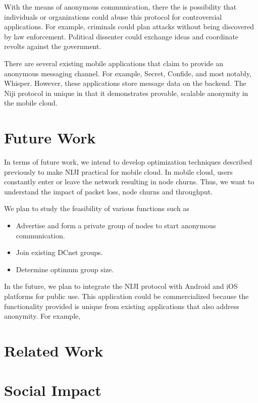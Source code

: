\documentclass{acm_proc_article-sp}
\begin{document}
With the means of anonymous communication, there the is possibility that individuals or organizations could abuse this protocol for controversial applications. For example, criminals could plan attacks without being discovered by law enforcement. Political dissenter could exchange ideas and coordinate revolts against the government.

There are several existing mobile applications that claim to provide an anonymous messaging channel. For example, Secret, Confide, and most notably, Whisper. However, these applications store message data on the backend. The Niji protocol in unique in that it demonstrates provable, scalable anonymity in the mobile cloud.

\section{Future Work}
\vspace{1 mm}

In terms of future work, we intend to develop optimization techniques described previously to make NIJI practical for mobile cloud. In mobile cloud, users constantly enter or leave the network resulting in node churns. Thus, we want to understand the impact of packet loss, node churns and throughput.  

We plan to study the feasibility of various functions such as
\begin{itemize}
\item Advertise and form a private group of nodes to start anonymous communication.
\item Join existing DCnet groups.
\item Determine optimum group size.
\end{itemize}

In the future, we plan to integrate the NIJI protocol with Android and iOS platforms for public use. This application could be commercialized because the functionality provided is unique from existing applications that also address anonymity. For example, 

\section{Related Work}
\vspace{1 mm}


\section{Social Impact}
\vspace{1 mm}
\end{document}
